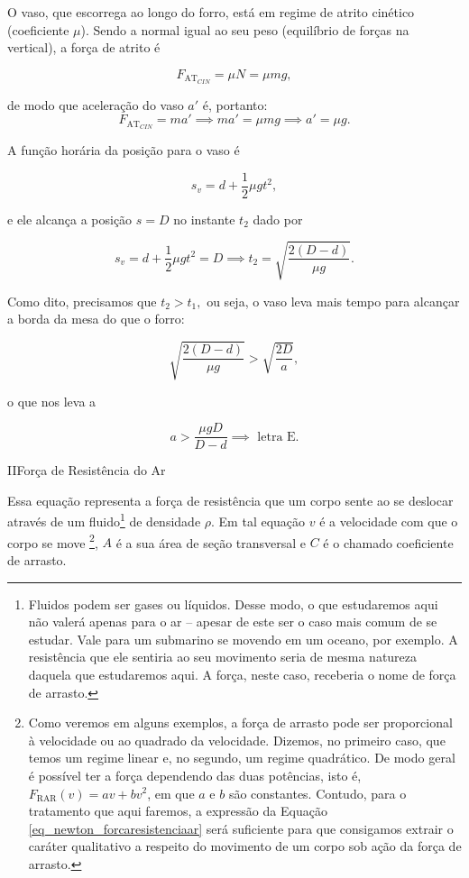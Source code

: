 \begin{exemplo}
\medskip

O vaso, que escorrega ao longo do forro, está em regime de atrito cinético (coeficiente $\mu$). Sendo a normal igual ao seu peso (equilíbrio de forças na vertical), a força de atrito é

$$F_{\text{AT}_{CIN}} = \mu N = \mu mg,$$

\noindent de modo que aceleração do vaso $a'$ é, portanto:
$$F_{\text{AT}_{CIN}} = ma' \implies ma' = \mu m g \implies  a' = \mu g.$$ 
 
A função horária da posição para o vaso é

$$s_v= d+\dfrac{1}{2} \mu gt^2,$$

\noindent e ele alcança a posição $s=D$ no instante $t_2$ dado por


$$s_v= d+\dfrac{1}{2} \mu gt^2 = D \implies t_2 = \sqrt{\dfrac{2(D-d)}{\mu g}}. $$

Como dito, precisamos que $t_2 > t_1,$ ou seja, o vaso leva mais tempo para alcançar a borda da mesa do que o forro:

$$ \sqrt{\dfrac{2(D-d)}{\mu g}} > \sqrt{\dfrac{2D}{a}},$$

\noindent o que nos leva a

$$ \boxed{a > \dfrac{\mu g D}{D-d} \implies \text{ letra E.}}$$

\end{exemplo}




\begin{secnivel}{II}{Força de Resistência do Ar}
  

\end{secnivel}




Essa equação representa a força de resistência que um corpo sente ao se deslocar através de um fluido\footnote{Fluidos podem ser gases ou líquidos. Desse modo, o que estudaremos aqui não valerá apenas para o ar -- apesar de este ser o caso mais comum de se estudar. Vale para um submarino se movendo em um oceano, por exemplo. A resistência que ele sentiria ao seu movimento seria de mesma natureza daquela que estudaremos aqui. A força, neste caso, receberia o nome de força de arrasto.} de densidade $\rho.$ Em tal equação $v$ é a velocidade com que o corpo se move \footnote{Como veremos em alguns exemplos, a força de arrasto pode ser proporcional à velocidade ou ao quadrado da velocidade. Dizemos, no primeiro caso, que temos um regime linear e, no segundo, um regime quadrático. De modo geral é possível ter a força dependendo das duas potências, isto é, $F_{\text{RAR}
}(v) = av + bv^2$, em que $a$ e $b$ são constantes. Contudo, para o tratamento que aqui faremos, a expressão da Equação \eqref{eq_newton_forcaresistenciaar} será suficiente para que consigamos extrair o caráter qualitativo a respeito do movimento de um corpo sob ação da força de arrasto.},  $A$ é a sua área de seção transversal e $C$ é o chamado coeficiente de arrasto.




